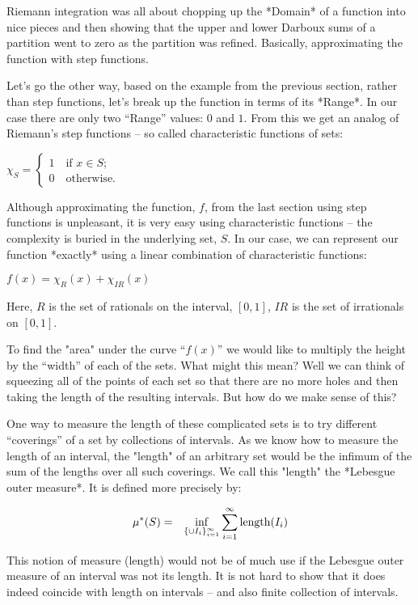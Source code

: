 \documentclass{article}
\begin{document}
Riemann integration was all about chopping up the *Domain* of a function into nice 
pieces and then showing that the upper and lower Darboux sums of a partition 
went to zero as the partition was refined. Basically, approximating the function 
with step functions.

Let's go the other way, based on the example from the previous section, rather 
than step functions, let's break up the function in terms of its *Range*. 
In our case there are only two ``Range'' values: $0$ and $1$. From this we get an 
analog of Riemann's step functions -- 
so called characteristic functions of sets:

$\chi_{S} = \begin{cases} 1 \quad \text{if $x \in  S$;} \\ 0 \quad \text{otherwise.} \end{cases}$

Although approximating the function, $f$, from the last section using step 
functions is unpleasant, it is very easy using characteristic functions -- the complexity 
is buried in the underlying set, $S$. In our case, we can represent our function *exactly*
using a linear combination of characteristic functions:

$f(x) = \chi_{R}(x) + \chi_{IR}(x)$

Here, $R$ is the set of rationals on the interval, $[0,1]$, $IR$ is the set 
of irrationals on $[0, 1]$.

To find the "area" under the curve ``$f(x)$'' we would like to multiply the 
height by the ``width'' of each of the sets. What might this mean?
Well we can think of squeezing all of the points of each set so that there are 
no more holes and then taking the length of the resulting intervals.
But how do we make sense of this?

One way to measure the length of these complicated sets is to try different ``coverings'' 
of a set by collections of intervals.
As we know how to measure the length of an interval, the "length" of an arbitrary set 
would be the infimum of the sum of the lengths over all such coverings.
We call this "length" the *Lebesgue outer measure*. It is defined more precisely by:

\begin{eqnarray}
	\mu^*(S) & = & \inf_{\{\cup {I_i}\}_{i=1}^\infty} \sum_{i=1}^\infty {\rm length}(I_i)
\end{eqnarray}

This notion of measure (length) would not be of much use if the Lebesgue outer measure of
an interval was not its length.
It is not hard to show that it does indeed coincide with length on 
intervals -- and also finite collection of intervals.
\end{document}

